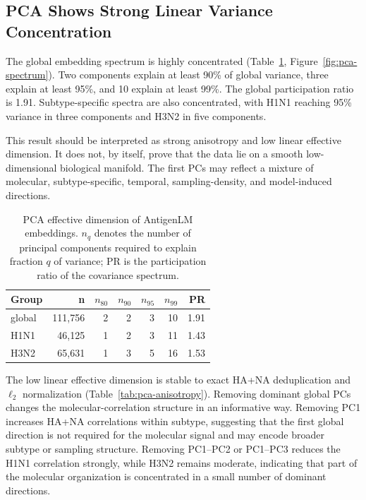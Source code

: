 \documentclass[11pt]{article}
\begin{document}
\subsection{PCA Shows Strong Linear Variance Concentration}

The global embedding spectrum is highly concentrated (Table~\ref{tab:pca}, Figure~\ref{fig:pca-spectrum}). Two components explain at least 90\% of global variance, three explain at least 95\%, and 10 explain at least 99\%. The global participation ratio is 1.91. Subtype-specific spectra are also concentrated, with H1N1 reaching 95\% variance in three components and H3N2 in five components.

This result should be interpreted as strong anisotropy and low linear effective dimension. It does not, by itself, prove that the data lie on a smooth low-dimensional biological manifold. The first PCs may reflect a mixture of molecular, subtype-specific, temporal, sampling-density, and model-induced directions.

\begin{table}[H]
\centering
\caption{PCA effective dimension of AntigenLM embeddings. $n_q$ denotes the number of principal components required to explain fraction $q$ of variance; PR is the participation ratio of the covariance spectrum.}
\label{tab:pca}
\begin{tabular}{lrrrrrr}
\toprule
Group & n & $n_{80}$ & $n_{90}$ & $n_{95}$ & $n_{99}$ & PR \\
\midrule
global & 111,756 & 2 & 2 & 3 & 10 & 1.91 \\
H1N1 & 46,125 & 1 & 2 & 3 & 11 & 1.43 \\
H3N2 & 65,631 & 1 & 3 & 5 & 16 & 1.53 \\
\bottomrule
\end{tabular}
\end{table}

The low linear effective dimension is stable to exact HA+NA deduplication and $\ell_2$ normalization (Table~\ref{tab:pca-anisotropy}). Removing dominant global PCs changes the molecular-correlation structure in an informative way. Removing PC1 increases HA+NA correlations within subtype, suggesting that the first global direction is not required for the molecular signal and may encode broader subtype or sampling structure. Removing PC1--PC2 or PC1--PC3 reduces the H1N1 correlation strongly, while H3N2 remains moderate, indicating that part of the molecular organization is concentrated in a small number of dominant directions.
\end{document}
